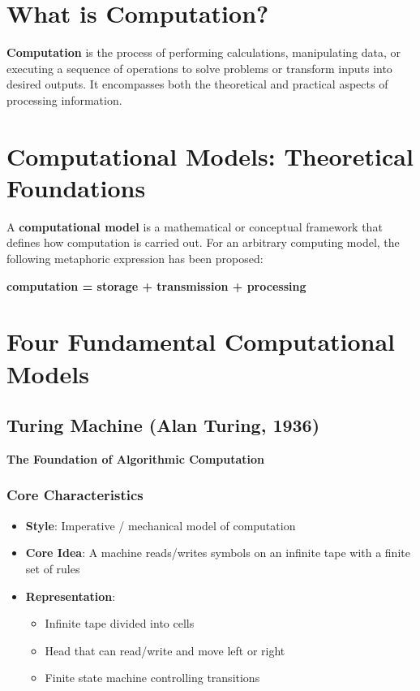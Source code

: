 \section{What is Computation?}
\textbf{Computation} is the process of performing calculations, manipulating data, or executing a sequence of operations to solve problems or transform inputs into desired outputs. It encompasses both the theoretical and practical aspects of processing information.

\section{Computational Models: Theoretical Foundations}
A \textbf{computational model} is a mathematical or conceptual framework that defines how computation is carried out. For an arbitrary computing model, the following metaphoric expression has been proposed:
\begin{center}
    \textbf{computation = storage + transmission + processing}
\end{center}

\section{Four Fundamental Computational Models}

\subsection{Turing Machine (Alan Turing, 1936)}
\textbf{The Foundation of Algorithmic Computation}

\subsubsection{Core Characteristics}
\begin{itemize}
    \item \textbf{Style}: Imperative / mechanical model of computation
    \item \textbf{Core Idea}: A machine reads/writes symbols on an infinite tape with a finite set of rules
    \item \textbf{Representation}:
    \begin{itemize}
        \item Infinite tape divided into cells
        \item Head that can read/write and move left or right
        \item Finite state machine controlling transitions
    \end{itemize}
\end{itemize}

